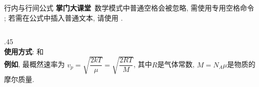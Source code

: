 \begin{frame}{行内与行间公式}
	\textbf{掌门大课堂}~数学模式中普通空格会被忽略, 需使用专用空格命令\label{back:MathQuad} ; 若需在公式中插入普通文本, 请使用 .\\
	\begin{columns}[T, onlytextwidth]
		\begin{column}{.45\columnwidth}
			\\[1ex]
			\textbf{使用方式}:  和 \\[1ex]
			\textbf{例如}, 最概然速率为 $v_p = \sqrt{\dfrac{2kT}{\mu}} = \sqrt{\dfrac{2RT}{M}}$, 其中$R$是气体常数, $M = N_A \mu$是物质的摩尔质量.\\[2ex]


\end{column}
\end{columns}
\end{frame}
